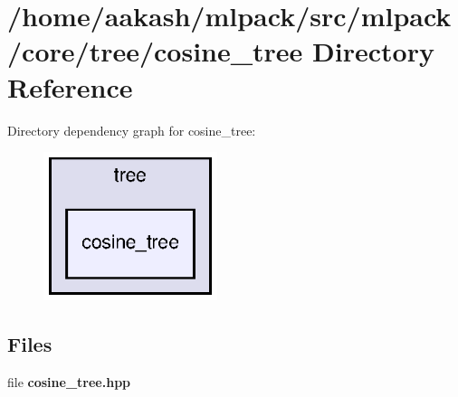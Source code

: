 \section{/home/aakash/mlpack/src/mlpack/core/tree/cosine\+\_\+tree Directory Reference}
\label{dir_47f18cd886ddfd9fe2e9eded46d048f4}
Directory dependency graph for cosine\+\_\+tree\+:
\nopagebreak
\begin{figure}[H]
\begin{center}
\leavevmode
\includegraphics[width=144pt]{dir_47f18cd886ddfd9fe2e9eded46d048f4_dep}
\end{center}
\end{figure}
\subsection*{Files}
\begin{DoxyCompactItemize}
\item 
file \textbf{ cosine\+\_\+tree.\+hpp}
\end{DoxyCompactItemize}
